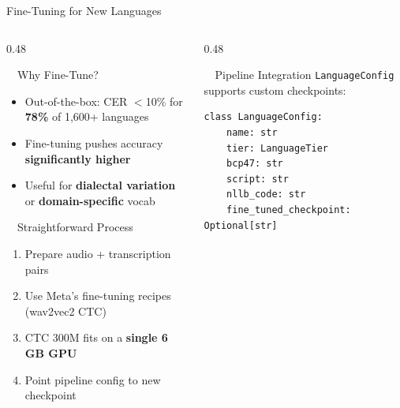 \documentclass[aspectratio=169, 11pt]{beamer}
\begin{document}
\begin{frame}[fragile]{Fine-Tuning for New Languages}
    \begin{columns}[T]
        \begin{column}{0.48\textwidth}
            \begin{block}{\faWrench\ \ Why Fine-Tune?}
                \scriptsize
                \begin{itemize}
                    \item Out-of-the-box: CER $<$10\% for \textbf{78\%} of 1,600+ languages
                    \item Fine-tuning pushes accuracy \textbf{significantly higher}
                    \item Useful for \textbf{dialectal variation} or \textbf{domain-specific} vocab
                \end{itemize}
            \end{block}
            \vspace{0.2em}
            \begin{exampleblock}{\faCheckCircle\ \ Straightforward Process}
                \scriptsize
                \begin{enumerate}
                    \item Prepare audio + transcription pairs
                    \item Use Meta's fine-tuning recipes (wav2vec2 CTC)
                    \item CTC 300M fits on a \textbf{single 6\,GB GPU}
                    \item Point pipeline config to new checkpoint
                \end{enumerate}
            \end{exampleblock}
        \end{column}
        \begin{column}{0.48\textwidth}
            \begin{block}{\faCode\ \ Pipeline Integration}
                \scriptsize
                \texttt{LanguageConfig} supports custom checkpoints:
                \begin{lstlisting}[basicstyle=\ttfamily\tiny, frame=none, backgroundcolor=\color{lightbg}]
class LanguageConfig:
    name: str
    tier: LanguageTier
    bcp47: str
    script: str
    nllb_code: str
    fine_tuned_checkpoint: Optional[str]
                \end{lstlisting}

\end{block}
\end{column}
\end{columns}
\end{frame}
\end{document}
